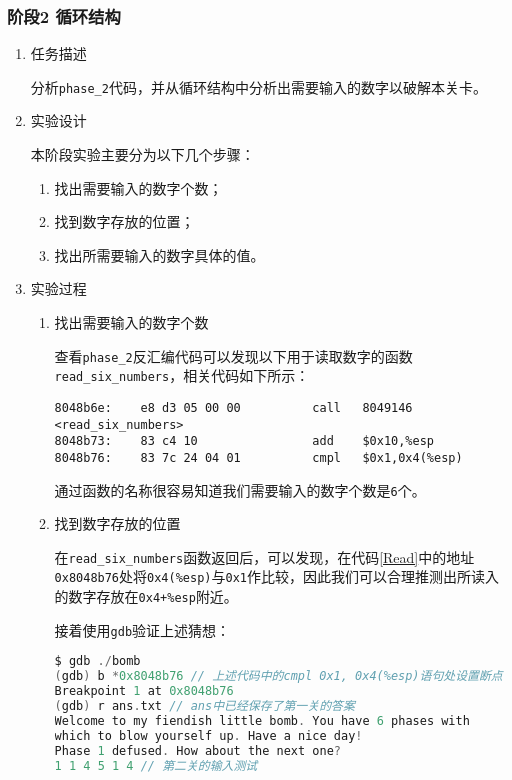 \documentclass{paper}
\begin{document}
\subsubsection{阶段2 循环结构}
\begin{enumerate}
\item 任务描述

分析\verb|phase_2|代码，并从循环结构中分析出需要输入的数字以破解本关卡。

\item 实验设计

本阶段实验主要分为以下几个步骤：

\begin{enumerate}
\item 找出需要输入的数字个数；
\item 找到数字存放的位置；
\item 找出所需要输入的数字具体的值。 
\end{enumerate}

\item 实验过程

\begin{enumerate}
\item 找出需要输入的数字个数

查看\verb|phase_2|反汇编代码可以发现以下用于读取数字的函数\verb|read_six_numbers|，相关代码如下所示：

\begin{lstlisting}[label={Read},caption={Read}]
8048b6e:	e8 d3 05 00 00       	call   8049146 <read_six_numbers>
8048b73:	83 c4 10             	add    $0x10,%esp
8048b76:	83 7c 24 04 01       	cmpl   $0x1,0x4(%esp)
\end{lstlisting}

通过函数的名称很容易知道我们需要输入的数字个数是\verb|6|个。

\item 找到数字存放的位置

在\verb|read_six_numbers|函数返回后，可以发现，在代码\ref{Read}中的地址\verb|0x8048b76|处将\verb|0x4(%esp)|与\verb|0x1|作比较，因此我们可以合理推测出所读入的数字存放在\verb|0x4+%esp|附近。

接着使用\verb|gdb|验证上述猜想：

\begin{lstlisting}[language=C]
$ gdb ./bomb
(gdb) b *0x8048b76 // 上述代码中的cmpl 0x1, 0x4(%esp)语句处设置断点
Breakpoint 1 at 0x8048b76
(gdb) r ans.txt // ans中已经保存了第一关的答案
Welcome to my fiendish little bomb. You have 6 phases with
which to blow yourself up. Have a nice day!
Phase 1 defused. How about the next one?
1 1 4 5 1 4 // 第二关的输入测试


\end{lstlisting}
\end{enumerate}
\end{enumerate}
\end{document}
